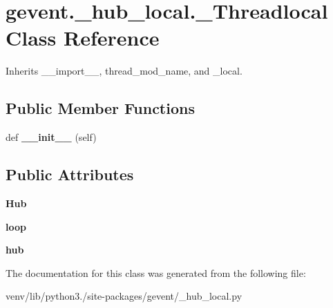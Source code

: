 \hypertarget{classgevent_1_1__hub__local_1_1___threadlocal}{}\section{gevent.\+\_\+hub\+\_\+local.\+\_\+\+Threadlocal Class Reference}
\label{classgevent_1_1__hub__local_1_1___threadlocal}


Inherits \+\_\+\+\_\+import\+\_\+\+\_\+, thread\+\_\+mod\+\_\+name, and \+\_\+local.

\subsection*{Public Member Functions}
\begin{DoxyCompactItemize}
\item 
\mbox{\label{classgevent_1_1__hub__local_1_1___threadlocal_aaa53dab8136adf14a7426105cabebe0b}} 
def {\bfseries \+\_\+\+\_\+init\+\_\+\+\_\+} (self)
\end{DoxyCompactItemize}
\subsection*{Public Attributes}
\begin{DoxyCompactItemize}
\item 
\mbox{\label{classgevent_1_1__hub__local_1_1___threadlocal_a102a0c902b9e9f698534933141b310c4}} 
{\bfseries Hub}
\item 
\mbox{\label{classgevent_1_1__hub__local_1_1___threadlocal_a9311975c91b0685717c17a089f11a856}} 
{\bfseries loop}
\item 
\mbox{\label{classgevent_1_1__hub__local_1_1___threadlocal_a6ec2fa530fd75f510aac9f2f6070cb71}} 
{\bfseries hub}
\end{DoxyCompactItemize}


The documentation for this class was generated from the following file\+:\begin{DoxyCompactItemize}
\item 
venv/lib/python3./site-\/packages/gevent/\+\_\+hub\+\_\+local.\+py\end{DoxyCompactItemize}
